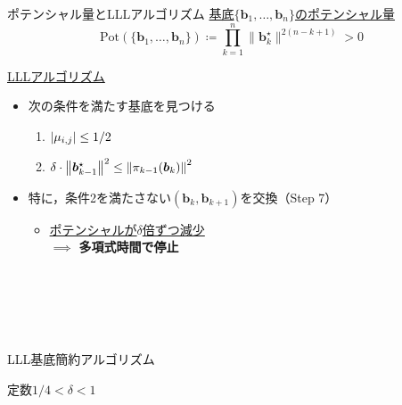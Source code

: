 \documentclass[12pt,aspectratio=169,xcolor=dvipsnames,table,dvipdfmx, leqno]{beamer}
\begin{document}
\begin{frame}{ポテンシャル量とLLLアルゴリズム}
\uline{基底$\{\bm{b}_1,\ldots,\bm{b}_n\}$の\alert{ポテンシャル量}}
\[\textstyle\mathrm{Pot}(\{\bm{b}_1,\ldots,\bm{b}_n\}) \coloneqq \prod_{k=1}^{n} \| \bm{b}_k^\star \|^{2(n-k+1)} > 0\]
\vspace{-14pt}
\begin{minipage}[b]{0.45\columnwidth}
    \uline{LLLアルゴリズム}\cite{LLL82}
    \begin{itemize}
        \item 次の条件を満たす基底を見つける
        \begin{enumerate}
            \item
            $\abs{\mu_{i, j}}\le 1/2$
            \item
            $\delta\cdot \norm{\bm{b}_{k-1}^\star}^2\le\norm{\pi_{k-1}(\bm{b}_k)}^2$
        \end{enumerate}
        \item 特に，条件2を満たさない$(\bm{b}_k, \bm{b}_{k+1})$を交換（Step 7）
        \begin{itemize}
            \item \uline{ポテンシャルが$\delta$倍ずつ減少} \\
            $\implies$ \alert{\textbf{多項式時間で停止}}
        \end{itemize}
    \end{itemize}
    \mbox{}\\
    \mbox{}\\
    \mbox{}\\
    \mbox{}\\
\end{minipage}
\hspace{0.03\columnwidth} %
\begin{minipage}[b]{0.45\columnwidth}
    \begin{algorithm}[H]
    \footnotesize
        \begin{algorithmic}[1]
            \caption{\footnotesize LLL基底簡約アルゴリズム\cite{LLL82}}
            \label{alg_LLL}
            \Statex 定数$1/4<\delta<1$

\end{algorithmic}
\end{algorithm}
\end{minipage}
\end{frame}
\end{document}
